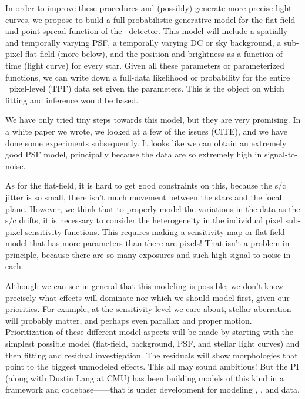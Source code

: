 \documentclass[letterpaper,12pt,preprint]{hack_aastex}
\begin{document}
In order to improve these procedures and (possibly) generate more precise
light curves, we propose to build a full probabilistic generative model for
the flat field and point spread function of the \Kepler\ detector.
This model will include a spatially and temporally varying PSF,
a temporally varying DC or sky background,
a sub-pixel flat-field (more below),
and the position and brightness as a function of time (light curve) for every
star.
Given all these parameters or parameterized functions, we can write down a
full-data likelihood or probability for the entire \Kepler\ pixel-level (TPF)
data set given the parameters.
This is the object on which fitting and inference would be based.

We have only tried tiny steps towards this model, but they are very promising.
In a white paper we wrote, we looked at a few of the issues (CITE),
and we have done some experiments subsequently.
It looks like we can obtain an extremely good PSF model,
principally because the data are so extremely high in signal-to-noise.

As for the flat-field, it is hard to get good constraints on this,
because the s/c jitter is so small, there isn't much movement between the
stars and the focal plane.
However, we think that to properly model the variations in the data as
the s/c drifts, it is necessary to consider the heterogeneity in the individual
pixel sub-pixel sensitivity functions.
This requires making a sensitivity map or flat-field model that has more
parameters than there are pixels!
That isn't a problem in principle, because there are so many exposures
and such high signal-to-noise in each.

Although we can see in general that this modeling is possible, we don't know
precisely what effects will dominate nor which we should model first, given
our priorities.
For example, at the sensitivity level we care about, stellar aberration will
probably matter, and perhaps even parallax and proper motion.
Prioritization of these different model aspects will be made by starting with
the simplest possible model (flat-field, background, PSF, and stellar light
curves) and then fitting and residual investigation.
The residuals will show morphologies that point to the biggest unmodeled
effects.
This all may sound ambitious!
But the PI (along with Dustin Lang at CMU) has been building models of this
kind in a framework and
codebase------that is under development for modeling
, , and  data.
\end{document}
